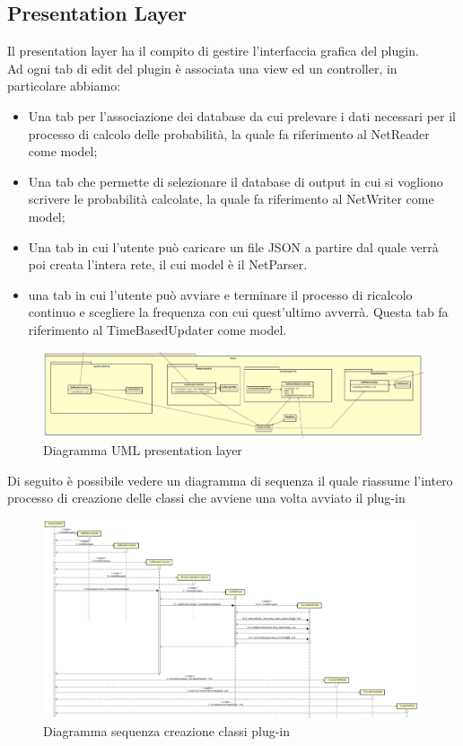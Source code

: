 \subsection{Presentation Layer}
Il presentation layer ha il compito di gestire l'interfaccia grafica del plugin.\\
Ad ogni tab di edit del plugin è associata una view ed un controller, in particolare abbiamo:
\begin{itemize}
	\item Una tab per l’associazione dei database da cui prelevare i dati necessari per il processo di calcolo delle probabilità, la quale fa riferimento al NetReader come model;
	\item Una tab che permette di selezionare il database di output in cui si vogliono scrivere le probabilità calcolate, la quale fa riferimento al NetWriter come model;
	\item Una tab in cui l'utente può caricare un file JSON a partire dal quale verrà poi creata l'intera rete, il cui model è il NetParser.
	\item una tab in cui l'utente può avviare e terminare il processo di ricalcolo continuo e scegliere la frequenza con cui quest'ultimo avverrà. Questa tab fa riferimento al TimeBasedUpdater come model.
\end{itemize}
\begin{figure} [H]
	\centering
	\includegraphics[scale=0.17]{Img/PresentationLayer}
	\caption{Diagramma UML presentation layer}\label{}
\end{figure}
Di seguito è possibile vedere un diagramma di sequenza il quale riassume l'intero processo di creazione delle classi che avviene una volta avviato il plug-in
\begin{figure} [H]
	\centering
	\includegraphics[scale=0.2]{Img/Creazione}
	\caption{Diagramma sequenza creazione classi plug-in}\label{}
\end{figure}
\pagebreak